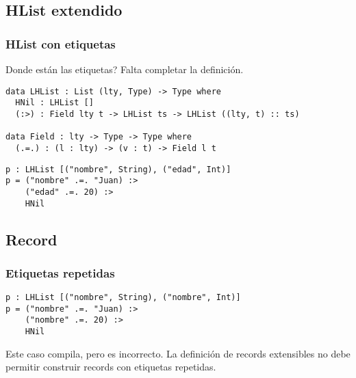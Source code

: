 \documentclass{beamer}
\begin{document}
\subsection{HList extendido}

\begin{frame}[fragile]
\frametitle{HList con etiquetas}

Donde están las etiquetas? Falta completar la definición.

\pause

\begin{definition}
\begin{verbatim}
data LHList : List (lty, Type) -> Type where
  HNil : LHList []
  (:>) : Field lty t -> LHList ts -> LHList ((lty, t) :: ts)

data Field : lty -> Type -> Type where
  (.=.) : (l : lty) -> (v : t) -> Field l t
\end{verbatim}
\end{definition}

\pause

\begin{example}
\begin{verbatim}
p : LHList [("nombre", String), ("edad", Int)]
p = ("nombre" .=. "Juan) :> 
    ("edad" .=. 20) :> 
    HNil
\end{verbatim}
\end{example}

\end{frame}

\subsection{Record}

\begin{frame}[fragile]
\frametitle{Etiquetas repetidas}

\begin{example}
\begin{verbatim}
p : LHList [("nombre", String), ("nombre", Int)]
p = ("nombre" .=. "Juan) :> 
    ("nombre" .=. 20) :> 
    HNil
\end{verbatim}
\end{example}

\pause

Este caso compila, pero es incorrecto. La definición de records extensibles no debe permitir construir records con etiquetas repetidas.

\end{frame}
\end{document}
